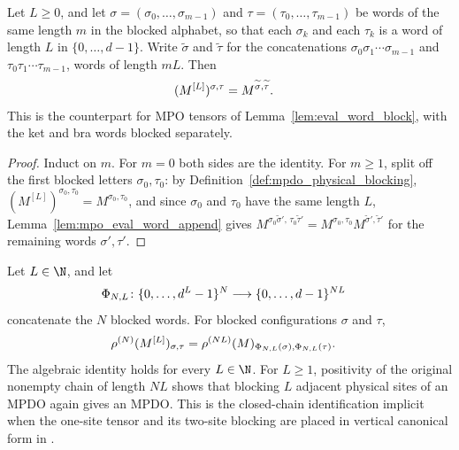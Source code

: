 \begin{lemma}
    \label{thm:mpo_eval_word_block}
    \leanok
    Let $L\geq0$, and let $\sigma=(\sigma_0,\ldots,\sigma_{m-1})$ and
    $\tau=(\tau_0,\ldots,\tau_{m-1})$ be words of the same length $m$ in the
    blocked alphabet, so that each $\sigma_k$ and each $\tau_k$ is a word of
    length $L$ in $\{0,\ldots,d-1\}$. Write $\widetilde\sigma$ and
    $\widetilde\tau$ for the concatenations
    $\sigma_0\sigma_1\cdots\sigma_{m-1}$ and $\tau_0\tau_1\cdots\tau_{m-1}$, words of
    length $mL$. Then
    \begin{align}
        (M^{[L]})^{\sigma,\tau}
         & =M^{\widetilde\sigma,\widetilde\tau}.
        \notag
    \end{align}
    This is the counterpart for MPO tensors of
    Lemma~\ref{lem:eval_word_block}, with the ket and bra words blocked
    separately.
\end{lemma}

\begin{proof}\leanok
    Induct on $m$. For $m=0$ both sides are the identity. For $m\geq1$,
    split off the first blocked letters $\sigma_0,\tau_0$: by
    Definition~\ref{def:mpdo_physical_blocking},
    $(M^{[L]})^{\sigma_0,\tau_0}=M^{\sigma_0,\tau_0}$, and since $\sigma_0$
    and $\tau_0$ have the same length $L$,
    Lemma~\ref{lem:mpo_eval_word_append} gives
    $M^{\sigma_0\widetilde\sigma',\,\tau_0\widetilde\tau'}
        =M^{\sigma_0,\tau_0}M^{\widetilde\sigma',\widetilde\tau'}$ for the
    remaining words $\sigma',\tau'$.
\end{proof}

\begin{theorem}
    \label{thm:mpdo_closed_chain_physical_blocking}
    \leanok
    Let $L\in\N$, and let
    \begin{align}
        \Phi_{N,L}\colon
        \{0,\ldots,d^L-1\}^N
         & \longrightarrow \{0,\ldots,d-1\}^{NL}
        \notag
    \end{align}
    concatenate the $N$ blocked words. For blocked configurations
    $\sigma$ and $\tau$,
    \begin{align}
        \rho^{(N)}(M^{[L]})_{\sigma,\tau}
         & =\rho^{(NL)}(M)_{\Phi_{N,L}(\sigma),\Phi_{N,L}(\tau)}.
        \notag
    \end{align}
    The algebraic identity holds for every $L\in\N$. For $L\geq1$, positivity
    of the original nonempty chain of length $NL$ shows that blocking $L$
    adjacent physical sites of an MPDO again gives an MPDO. This is the
    closed-chain identification implicit
    when the one-site tensor and its two-site blocking are placed in vertical
    canonical form in
    \cite[Appendix~C.4, lines~1952--2017]{Cirac2016MPDO_arXiv}.
\end{theorem}

